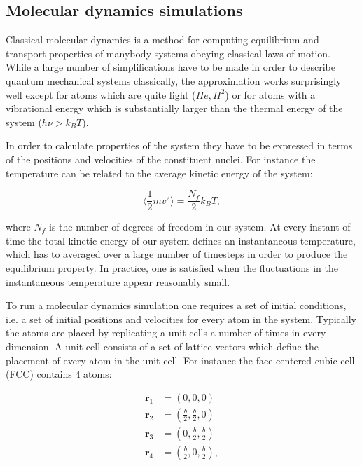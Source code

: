 \subsection{Molecular dynamics simulations}
Classical molecular dynamics is a method
for computing equilibrium and transport properties
of manybody systems obeying classical laws of motion.
While a large number of simplifications have to be made
in order to describe quantum mechanical systems classically,
the approximation works surprisingly well
except for atoms which are quite light ($He, H^2$)
or for atoms with a vibrational energy
which is substantially larger than the thermal energy
of the system ($h\nu > k_B T$).
\par
In order to calculate properties of the system
they have to be expressed in terms of the positions
and velocities of the constituent nuclei.
For instance the temperature can be related
to the average kinetic energy of the system:

$$ \langle \frac{1}{2} m v^2 \rangle = \frac{N_f}{2} k_B T , $$

where $N_f$ is the number of degrees of freedom in our system.
At every instant of time the total kinetic energy
of our system defines an instantaneous temperature,
which has to averaged over a large number of timesteps
in order to produce the equilibrium property.
In practice, one is satisfied when the fluctuations
in the instantaneous temperature appear reasonably small.
\par
To run a molecular dynamics simulation one requires
a set of initial conditions, i.e. a set of initial positions and velocities
for every atom in the system. Typically the atoms
are placed by replicating a unit cells a number of times
in every dimension. A unit cell consists of a set
of lattice vectors which define the placement of every atom in the
unit cell. For instance the face-centered cubic cell (FCC)
contains 4 atoms:

\begin{equation}
    \begin{split}
        \bm{r}_1 &= (0, 0, 0) \\
        \bm{r}_2 &= (\frac{b}{2}, \frac{b}{2}, 0) \\
        \bm{r}_3 &= (0, \frac{b}{2}, \frac{b}{2}) \\
        \bm{r}_4 &= (\frac{b}{2}, 0, \frac{b}{2}) , \\
    \end{split}
\end{equation}

